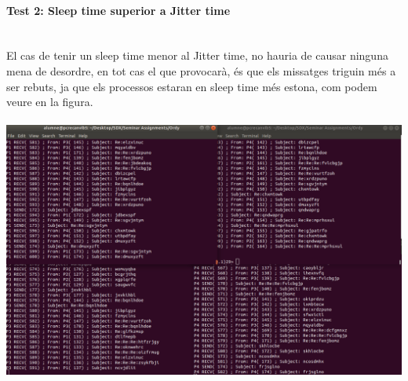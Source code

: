 \documentclass[a4paper, 10pt]{article}
\begin{document}
\begin{enumerate}
\paragraph[bold]{Test 2: Sleep time superior a Jitter time\\\\}
El cas de tenir un sleep time menor al Jitter time, no hauria de causar ninguna mena de desordre, en tot cas el que provocarà, és que els missatges triguin més a ser rebuts, ja que els processos estaran en sleep time més estona, com podem veure en la figura.\\\\
\includegraphics[width=\textwidth]{ordy-causal-2}
\end{enumerate}
\end{document}
